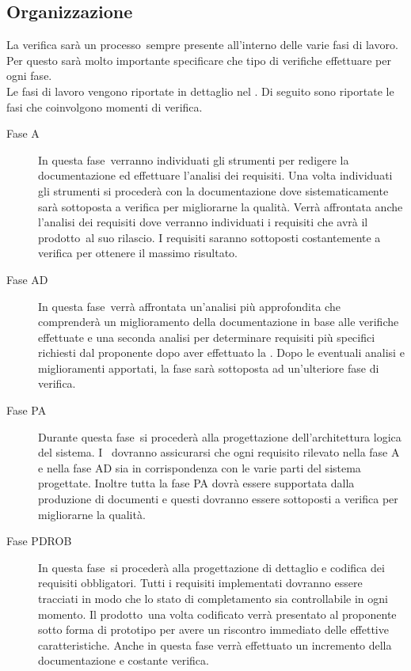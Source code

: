 \documentclass[../PianoDiQualifica.tex]{subfiles}
\begin{document}
		\subsection{Organizzazione}
		 La verifica sarà un processo\g\ sempre presente all'interno delle varie fasi di lavoro. Per questo sarà molto importante specificare che tipo di verifiche effettuare per ogni fase\g.
\\Le fasi di lavoro vengono riportate in dettaglio nel \pianodiprogettov. Di seguito sono riportate le fasi che coinvolgono momenti di verifica.
		 \begin{description}
		 	\item[Fase A] In questa fase\g\ 
verranno individuati gli strumenti per redigere la documentazione ed effettuare l'analisi dei requisiti. Una volta individuati gli strumenti si procederà con la documentazione dove sistematicamente sarà sottoposta a verifica per migliorarne la qualità. Verrà affrontata anche l'analisi dei requisiti dove verranno individuati i requisiti che avrà il prodotto\g\ al suo rilascio. I requisiti saranno sottoposti costantemente a verifica per ottenere il massimo risultato.
		 	\item[Fase AD] In questa fase\g\ 
verrà affrontata un'analisi più approfondita che comprenderà un miglioramento della documentazione in base alle verifiche effettuate e una seconda analisi per determinare requisiti più specifici richiesti dal proponente dopo aver effettuato la \revisionedeirequisiti. Dopo le eventuali analisi e miglioramenti apportati, la fase sarà sottoposta ad un'ulteriore fase di verifica.
			\item[Fase PA] Durante questa fase\g\ 
si procederà alla progettazione dell'architettura logica del sistema. I \verificatori\ dovranno assicurarsi che ogni requisito rilevato nella fase A e nella fase AD sia in corrispondenza con le varie parti del sistema progettate. Inoltre tutta la fase PA dovrà essere supportata dalla produzione di documenti e questi dovranno essere sottoposti a verifica per migliorarne la qualità.
		 	\item[Fase PDROB] In questa fase\g\ 
si procederà alla progettazione di dettaglio e codifica dei requisiti obbligatori. Tutti i requisiti implementati dovranno essere tracciati in modo che lo stato di completamento sia controllabile in ogni momento. Il prodotto\g\ una volta codificato verrà presentato al proponente sotto forma di prototipo per avere un riscontro immediato delle effettive caratteristiche. Anche in questa fase verrà effettuato un incremento della documentazione e costante verifica.  

\end{description}
\end{document}
